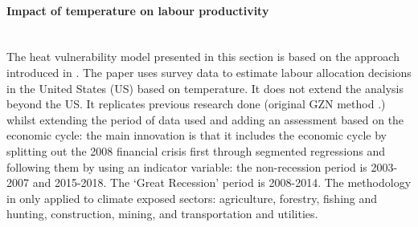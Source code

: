 \label{SubSec:HeatVulnerabilityModel}

\paragraph{Impact of temperature on labour productivity\\}
\textbf{\\}
The heat vulnerability model presented in this section is based on the approach introduced in \cite{NeidellEtAl:2021}. The paper uses survey data to estimate labour allocation decisions in the United States (US) based on temperature. It does not extend the analysis beyond the US. It replicates previous research done (original GZN method \cite{NeidellEtAl:2014}.) whilst extending the period of data used and adding an assessment based on the economic cycle: the main innovation is that it includes the economic cycle by splitting out the 2008 financial crisis first through segmented regressions and following them by using an indicator variable: the non-recession period is 2003-2007 and 2015-2018. The `Great Recession' period is 2008-2014. The methodology in only applied to climate exposed sectors: agriculture, forestry, fishing and hunting, construction, mining, and transportation and utilities.

